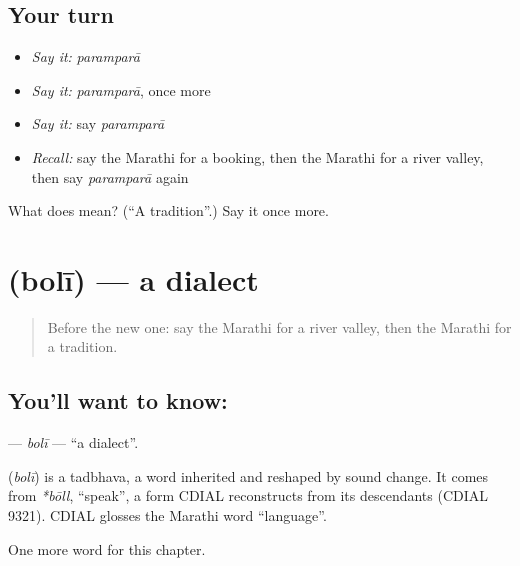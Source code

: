 \subsection*{Your turn}
\begin{itemize}
\raggedright
  \item \emph{Say it:} \emph{paramparā}
  \item \emph{Say it:} \emph{paramparā}, once more
  \item \emph{Say it:} say \emph{paramparā}
  \item \emph{Recall:} say the Marathi for a booking, then the Marathi for a river valley, then say \emph{paramparā} again
\end{itemize}

\begin{tcolorbox}[breakable,colback=teal!4,colframe=teal!35!black,title={Before you move on}]
What does  mean? (\textquotedblleft{}A tradition\textquotedblright{}.) Say it once more.
\end{tcolorbox}
\section[\texorpdfstring{\mr{बोली} (bolī)}{बोली (bolī)}]{ (bolī) — a dialect}

\label{lesson:MR-C237-boli}



\begin{quote}
Before the new one: say the Marathi for a river valley, then the Marathi for a tradition.
\end{quote}

\subsection*{You'll want to know: }
\textbf{} — \emph{bolī} — \textquotedblleft{}a dialect\textquotedblright{}.

\begin{cousinweb}
\textbf{} (\emph{bolī}) is a tadbhava, a word inherited and reshaped by sound change. It comes from \emph{*bōll}, \textquotedblleft{}speak\textquotedblright{}, a form CDIAL reconstructs from its descendants (CDIAL 9321). CDIAL glosses the Marathi word \textquotedblleft{}language\textquotedblright{}.
\end{cousinweb}

\begin{grammarlens}[title={What you've built}]
One more word for this chapter.
\end{grammarlens}

